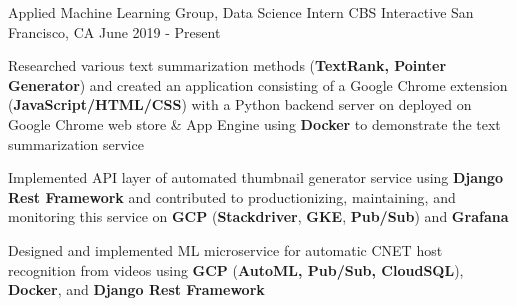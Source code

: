 

\begin{cventries}

\cventry
    {Applied Machine Learning Group, Data Science Intern} %
    {CBS Interactive} %
    {San Francisco, CA} %
    {June 2019 - Present} %
    {
      \begin{cvitems} %
 		\item {Researched various text summarization methods (\textbf{TextRank, Pointer Generator}) and created an application consisting of a Google Chrome extension (\textbf{JavaScript/HTML/CSS}) with a Python backend server on deployed on Google Chrome web store \& App Engine using \textbf{Docker} to demonstrate the text summarization service}
 		\item {Implemented API layer of automated thumbnail generator service using \textbf{Django Rest Framework} and contributed to productionizing, maintaining, and monitoring this service on \textbf{GCP} (\textbf{Stackdriver}, \textbf{GKE}, \textbf{Pub/Sub}) and \textbf{Grafana}}
  		\item {Designed and implemented ML microservice for automatic CNET host recognition from videos using \textbf{GCP} (\textbf{AutoML, Pub/Sub, CloudSQL}), \textbf{Docker}, and \textbf{Django Rest Framework}}
      \end{cvitems}
    }


\end{cventries}
